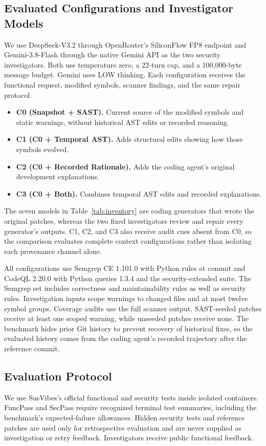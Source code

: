 \documentclass[10pt,conference]{IEEEtran}
\newcommand{\code}[1]{\texttt{\detokenize{#1}}}
\begin{document}
\subsection{Evaluated Configurations and Investigator Models}
We use DeepSeek-V3.2 through OpenRouter's SiliconFlow FP8 endpoint and Gemini-3.8-Flash through the native Gemini API as the two security investigators. Both use temperature zero, a 22-turn cap, and a 100,000-byte message budget. Gemini uses LOW thinking. Each configuration receives the functional request, modified symbols, scanner findings, and the same repair protocol.
\begin{itemize}
\item \textbf{C0 (Snapshot + SAST).} Current source of the modified symbols and static warnings, without historical AST edits or recorded reasoning.
\item \textbf{C1 (C0 + Temporal AST).} Adds structural edits showing how those symbols evolved.
\item \textbf{C2 (C0 + Recorded Rationale).} Adds the coding agent's original development explanations.
\item \textbf{C3 (C0 + Both).} Combines temporal AST edits and recorded explanations.
\end{itemize}
The seven models in Table~\ref{tab:inventory} are coding generators that wrote the original patches, whereas the two fixed investigators review and repair every generator's outputs. C1, C2, and C3 also receive audit cues absent from C0, so the comparison evaluates complete context configurations rather than isolating each provenance channel alone.

All configurations use Semgrep CE 1.101.0 with Python rules at commit \code{495df89c} and CodeQL 2.20.0 with Python queries 1.3.4 and the security-extended suite. The Semgrep set includes correctness and maintainability rules as well as security rules. Investigation inputs scope warnings to changed files and at most twelve symbol groups. Coverage audits use the full scanner output. SAST-seeded patches receive at least one scoped warning, while unseeded patches receive none. The benchmark hides prior Git history to prevent recovery of historical fixes, so the evaluated history comes from the coding agent's recorded trajectory after the reference commit.

\subsection{Evaluation Protocol}
We use SusVibes's official functional and security tests inside isolated containers. FuncPass and SecPass require recognized terminal test summaries, including the benchmark's expected-failure allowances. Hidden security tests and reference patches are used only for retrospective evaluation and are never supplied as investigation or retry feedback. Investigators receive public functional feedback.
\end{document}
